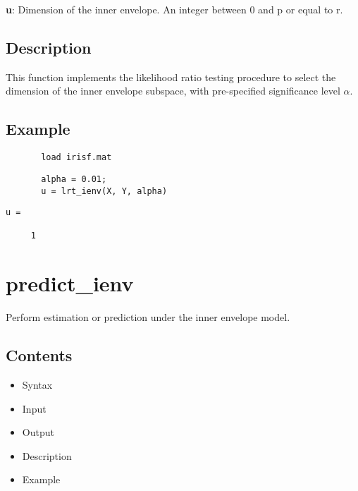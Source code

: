 \documentclass[a4paper,11pt,openany]{memoir}
\begin{document}
\begin{par}
\textbf{u}: Dimension of the inner envelope. An integer between 0 and p or equal to r.
\end{par} \vspace{1em}


\subsection*{Description}

\begin{par}
This function implements the likelihood ratio testing procedure to select the dimension of the inner envelope subspace, with pre-specified significance level $\alpha$.
\end{par} \vspace{1em}


\subsection*{Example}


\begin{verbatim}       load irisf.mat\end{verbatim}
    
\begin{verbatim}       alpha = 0.01;
       u = lrt_ienv(X, Y, alpha)\end{verbatim}
    
        \color{lightgray}\ttfamily \begin{verbatim}
u =

     1

\end{verbatim} \rmfamily
\color{black}

\newpage

\rmfamily
\color{black}\section{predict\_ienv}

\begin{par}
Perform estimation or prediction under the inner envelope model.
\end{par} \vspace{1em}

\subsection*{Contents}

\begin{itemize}
\setlength{\itemsep}{-1ex}
   \item Syntax
   \item Input
   \item Output
   \item Description
   \item Example
\end{itemize}
\end{document}
